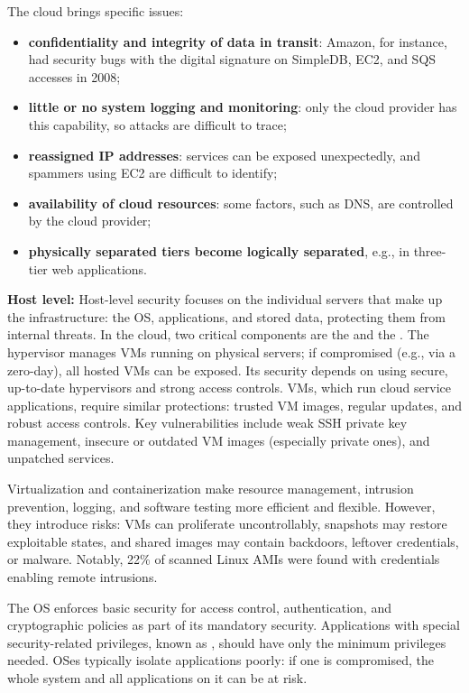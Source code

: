 The cloud brings specific issues:

\begin{itemize}
    \item \textbf{confidentiality and integrity of data in transit}: Amazon, for instance, had security bugs with the digital signature on SimpleDB, EC2, and SQS accesses in 2008;
    \item \textbf{little or no system logging and monitoring}: only the cloud provider has this capability, so attacks are difficult to trace;
    \item \textbf{reassigned IP addresses}: services can be exposed unexpectedly, and spammers using EC2 are difficult to identify;
    \item \textbf{availability of cloud resources}: some factors, such as DNS, are controlled by the cloud provider;
    \item \textbf{physically separated tiers become logically separated}, e.g., in three-tier web applications.
\end{itemize}

\textbf{Host level:} Host-level security focuses on the individual servers that make up the infrastructure: the OS, applications, and stored data, protecting them from internal threats. In the cloud, two critical components are the  and the . The hypervisor manages VMs running on physical servers; if compromised (e.g., via a zero-day), all hosted VMs can be exposed. Its security depends on using secure, up-to-date hypervisors and strong access controls. VMs, which run cloud service applications, require similar protections: trusted VM images, regular updates, and robust access controls. Key vulnerabilities include weak SSH private key management, insecure or outdated VM images (especially private ones), and unpatched services.

\begin{warningblock}
    Virtualization and containerization make resource management, intrusion prevention, logging, and software testing more efficient and flexible. However, they introduce risks: VMs can proliferate uncontrollably, snapshots may restore exploitable states, and shared images may contain backdoors, leftover credentials, or malware. Notably, 22\% of scanned Linux AMIs were found with credentials enabling remote intrusions.
\end{warningblock}

The OS enforces basic security for access control, authentication, and cryptographic policies as part of its mandatory security. Applications with special security-related privileges, known as , should have only the minimum privileges needed. OSes typically isolate applications poorly: if one is compromised, the whole system and all applications on it can be at risk.

